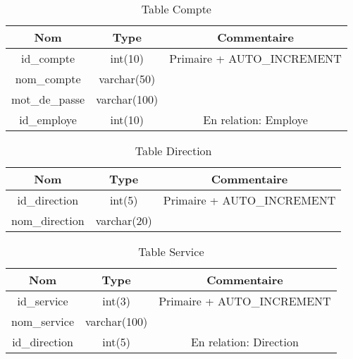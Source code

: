 \documentclass{report}
\begin{document}
\begin{table}[h!]
    \begin{center}
        \begin{tabular}{|c|c|c|}
            \hline
            \textbf{Nom} & \textbf{Type} & \textbf{Commentaire}  \\
            \hline
            id\_compte & int(10) & Primaire + AUTO\_INCREMENT \\
            \hline
            nom\_compte & varchar(50) & \\
            \hline
            mot\_de\_passe & varchar(100) & \\
            \hline
            id\_employe & int(10) & En relation: Employe \\
            \hline
        \end{tabular}
    \end{center}
\caption{Table Compte}
\end{table}

\begin{table}[h!]
    \begin{center}
        \begin{tabular}{|c|c|c|}
            \hline
            \textbf{Nom} & \textbf{Type} & \textbf{Commentaire}  \\
            \hline
            id\_direction & int(5) & Primaire + AUTO\_INCREMENT \\
            \hline
            nom\_direction & varchar(20) & \\
            \hline
        \end{tabular}
    \end{center}
\caption{Table Direction}
\end{table}

\begin{table}[h!]
    \begin{center}
        \begin{tabular}{|c|c|c|}
            \hline
            \textbf{Nom} & \textbf{Type} & \textbf{Commentaire}  \\
            \hline
            id\_service & int(3) & Primaire + AUTO\_INCREMENT \\
            \hline
            nom\_service & varchar(100) &  \\
            \hline
            id\_direction & int(5) & En relation: Direction \\
            \hline
        \end{tabular}
    \end{center}
\caption{Table Service}
\end{table}
\end{document}
